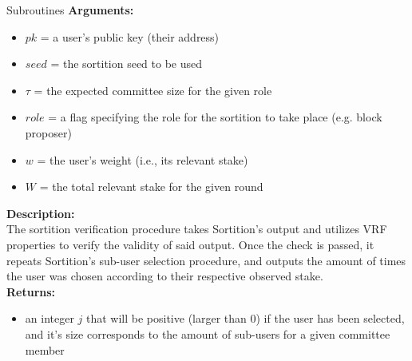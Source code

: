 \documentclass[10pt,a4paper]{article}
\begin{document}
\begin{section}{Subroutines}
\noindent \textbf{Arguments:}
\begin{itemize}
    \item $pk$ = a user's public key (their address)
    \item $seed$ = the sortition seed to be used
    \item $\tau$ = the expected committee size for the given role
    \item $role$ = a flag specifying the role for the sortition to take place (e.g. block proposer)
    \item $w$ = the user's weight (i.e., its relevant stake)
    \item $W$ = the total relevant stake for the given round
  \end{itemize}

\noindent \textbf{Description:}\\
The sortition verification procedure takes Sortition's output and utilizes 
VRF properties to verify the validity of said output.
Once the check is passed, it repeats Sortition's sub-user selection procedure, 
and outputs the amount of times the user was chosen according to their respective 
observed stake.\\

\noindent \textbf{Returns:}
\begin{itemize}
    \item an integer $j$ that will be positive (larger than 0) if the user has been 
    selected, and it's size corresponds to the amount
    of sub-users for a given committee member
  \end{itemize}


\end{section}
\end{document}
